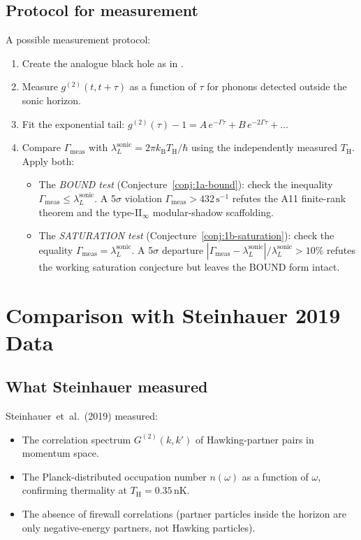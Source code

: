 \documentclass[12pt,a4paper]{article}
\renewcommand{\TH}{T_{\mathrm{H}}}
\newcommand{\lambdaL}{\lambda_L^{\mathrm{sonic}}}
\newcommand{\kB}{k_{\mathrm{B}}}
\begin{document}
\subsection{Protocol for measurement}

A possible measurement protocol:
\begin{enumerate}
  \item Create the analogue black hole as in \cite{steinhauer2019}.
  \item Measure $g^{(2)}(t, t+\tau)$ as a function of $\tau$ for phonons
    detected outside the sonic horizon.
  \item Fit the exponential tail: $g^{(2)}(\tau) - 1 = A\,e^{-\Gamma\tau}
    + B\,e^{-2\Gamma\tau} + \ldots$
  \item Compare $\Gamma_{\mathrm{meas}}$ with $\lambdaL = 2\pi\kB\TH/\hbar$
    using the independently measured $\TH$.  Apply both:
    \begin{itemize}
      \item The \emph{BOUND test} (Conjecture~\ref{conj:1a-bound}):
        check the inequality $\Gamma_{\mathrm{meas}} \leq \lambdaL$.
        A 5$\sigma$ violation $\Gamma_{\mathrm{meas}} >
        432\,\mathrm{s}^{-1}$ refutes the A11 finite-rank theorem
        and the type-II$_\infty$ modular-shadow scaffolding.
      \item The \emph{SATURATION test} (Conjecture~\ref{conj:1b-saturation}):
        check the equality $\Gamma_{\mathrm{meas}} = \lambdaL$.
        A 5$\sigma$ departure $|\Gamma_{\mathrm{meas}} - \lambdaL|/
        \lambdaL > 10\%$ refutes the working saturation conjecture
        but leaves the BOUND form intact.
    \end{itemize}
\end{enumerate}

\section{Comparison with Steinhauer 2019 Data}
\label{sec:comparison}

\subsection{What Steinhauer measured}

Steinhauer~et~al.\ (2019) \cite{steinhauer2019} measured:
\begin{itemize}
  \item The correlation spectrum $G^{(2)}(k, k')$ of Hawking-partner pairs
    in momentum space.
  \item The Planck-distributed occupation number $n(\omega)$ as a function
    of $\omega$, confirming thermality at $\TH = 0.35\,\mathrm{nK}$.
  \item The absence of firewall correlations (partner particles inside the
    horizon are only negative-energy partners, not Hawking particles).
\end{itemize}
\end{document}
